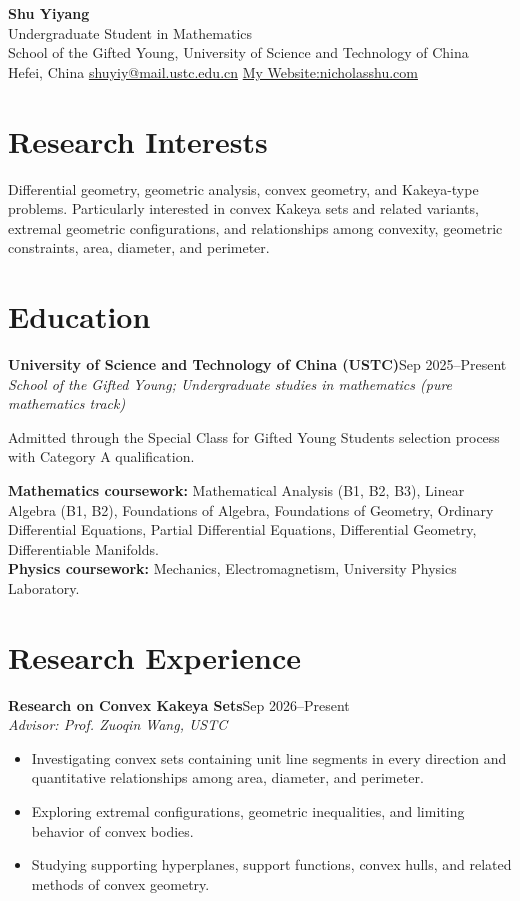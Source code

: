 \documentclass[10pt,a4paper]{article}
\newcommand{\entry}[3]{\textbf{#1}\hfill{\small #2}\\{\emph{#3}}\par}
\begin{document}
\begin{center}
{\LARGE\bfseries Shu Yiyang}\\[4pt]
{\normalsize Undergraduate Student in Mathematics}\\[2pt]
School of the Gifted Young, University of Science and Technology of China\\[2pt]
Hefei, China \quad\textbar\quad \href{mailto:shuyiy@mail.ustc.edu.cn}{shuyiy@mail.ustc.edu.cn} \quad\textbar\quad \href{https://nicholasshu.com}{My Website:nicholasshu.com}
\end{center}
\vspace{-7pt}
\section*{Research Interests}
Differential geometry, geometric analysis, convex geometry, and Kakeya-type problems. Particularly interested in convex Kakeya sets and related variants, extremal geometric configurations, and relationships among convexity, geometric constraints, area, diameter, and perimeter.
\section*{Education}
\entry{University of Science and Technology of China (USTC)}{Sep 2025--Present}{School of the Gifted Young; Undergraduate studies in mathematics (pure mathematics track)}
Admitted through the Special Class for Gifted Young Students selection process with Category A qualification.
\par
\textbf{Mathematics coursework:} Mathematical Analysis (B1, B2, B3), Linear Algebra (B1, B2), Foundations of Algebra, Foundations of Geometry, Ordinary Differential Equations, Partial Differential Equations, Differential Geometry, Differentiable Manifolds.\\
\textbf{Physics coursework:} Mechanics, Electromagnetism, University Physics Laboratory.
\section*{Research Experience}
\entry{Research on Convex Kakeya Sets}{Sep 2026--Present}{Advisor: Prof. Zuoqin Wang, USTC}
\begin{itemize}
\item Investigating convex sets containing unit line segments in every direction and quantitative relationships among area, diameter, and perimeter.
\item Exploring extremal configurations, geometric inequalities, and limiting behavior of convex bodies.
\item Studying supporting hyperplanes, support functions, convex hulls, and related methods of convex geometry.
\end{itemize}
\end{document}
